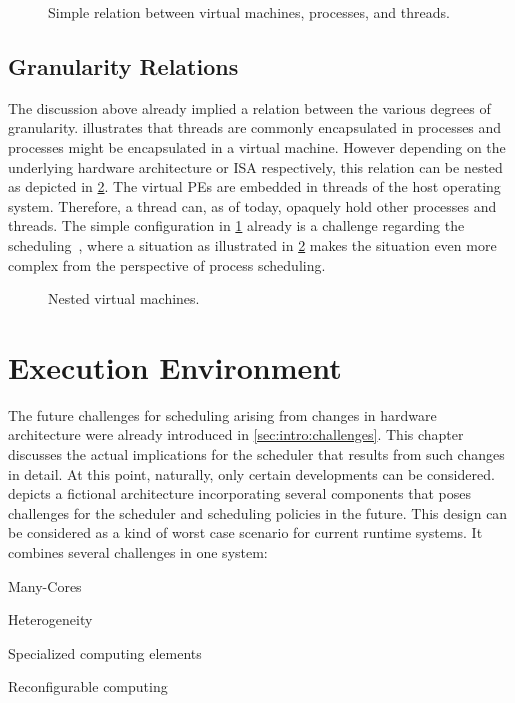 \begin{figure}[t!] \centering
	\caption{Simple relation between virtual machines, processes, and threads.}%
	\label{fig:req:relation}
\end{figure}

\subsection{Granularity Relations}

The discussion above already implied a relation between the various degrees of granularity.  illustrates that threads are commonly encapsulated in processes and processes might be encapsulated in a virtual machine. However depending on the underlying hardware architecture or \ac{ISA} respectively, this relation can be nested as depicted in \cref{fig:req:vm_nested}. The virtual \acp{PE} are embedded in threads of the host operating system. Therefore, a thread can, as of today, opaquely hold other processes and threads. The simple configuration in \cref{fig:req:relation} already is a challenge regarding the scheduling~\cite{Busse-2015-PartialCoSched}, where a situation as illustrated in \cref{fig:req:vm_nested} makes the situation even more complex from the perspective of process scheduling.

\begin{figure}[t!] \centering
	\caption{Nested virtual machines.}
	\label{fig:req:vm_nested}
\end{figure}

\section{Execution Environment}%
\label{sec:env}

The future challenges for scheduling arising from changes in hardware architecture were already introduced in \cref{sec:intro:challenges}. This chapter discusses the actual implications for the scheduler that results from such changes in detail. At this point, naturally, only certain developments can be considered.  depicts a fictional architecture incorporating several components that poses challenges for the scheduler and scheduling policies in the future. This design can be considered as a kind of worst case scenario for current runtime systems. It combines several challenges in one system:
\begin{itemize*}
	\item Many-Cores
	\item Heterogeneity
	\item Specialized computing elements
	\item Reconfigurable computing
\end{itemize*}


